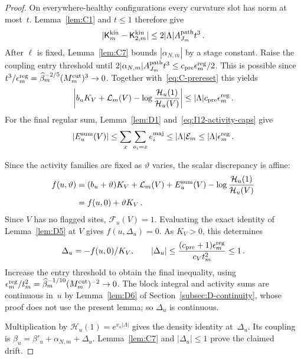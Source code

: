 \begin{proof}
On everywhere-healthy configurations every curvature slot has norm at most~$t$. Lemma~\ref{lem:C1} and $t\le1$ therefore give
\begin{equation*}
|\mathsf K^{\rm kin}_m-\mathsf K^{\rm kin}_{2,m}|\le2|\Lambda|A_{J_m}^{\rm path}t^3\,.
\end{equation*}
After $\ell$ is fixed, Lemma~\ref{lem:C7} bounds $|\alpha_{N,m}|$ by a stage constant. Raise the coupling entry threshold until $2|\alpha_{N,m}|A_{J_m}^{\rm path}t^3\le c_{\rm pre}\epsilon_m^{\rm reg}/2$. This is possible since $t^3/\epsilon_m^{\rm reg}=\widehat{\beta}_m^{-2/5}(M^{\mathrm{cut}}_m)^3\to0$. Together with~\eqref{eq:C-prereset} this yields
\begin{equation*}
\left|b_uK_V+\mathcal L_m(V)-\log\frac{\mathcal H_u(1)}{\mathcal H_u(V)}\right|
\le|\Lambda|c_{\rm pre}\epsilon_m^{\rm reg}\,.
\end{equation*}
For the final regular sum, Lemma~\ref{lem:D1} and~\eqref{eq:I12-activity-caps} give
\begin{equation*}
|E_u^{\rm sum}(V)|\le\sum_x\sum_{o_i=x}e_i^{\rm maj}
\le|\Lambda|\mathcal E_m\le|\Lambda|\epsilon_m^{\rm reg}\,.
\end{equation*}

Since the activity families are fixed as $\vartheta$ varies, the scalar discrepancy is affine:
\begin{align*}
f(u,\vartheta)&=(b_u+\vartheta)K_V+\mathcal L_m(V)+E_u^{\rm sum}(V)
-\log\frac{\mathcal H_u(1)}{\mathcal H_u(V)}\\
&=f(u,0)+\vartheta K_V\,.
\end{align*}
Since $V$ has no flagged sites, $\mathcal F_u(V)=1$. Evaluating the exact identity of Lemma~\ref{lem:D5} at $V$ gives $f(u,\Delta_u)=0$. As $K_V>0$, this determines
\begin{equation*}
\Delta_u=-f(u,0)/K_V,\qquad
|\Delta_u|\le\frac{(c_{\rm pre}+1)\epsilon_m^{\rm reg}}{c_Vt_m^2}\le1\,.
\end{equation*}
Increase the entry threshold to obtain the final inequality, using $\epsilon_m^{\rm reg}/t_m^2=\widehat{\beta}_m^{-1/10}(M^{\mathrm{cut}}_m)^{-2}\to0$. The block integral and activity sums are continuous in~$u$ by Lemma~\ref{lem:D6} of Section~\ref{subsec:D-continuity}, whose proof does not use the present lemma; so $\Delta_u$ is continuous.

Multiplication by $\mathcal H_u(1)=e^{v_u|\Lambda|}$ gives the density identity at~$\Delta_u$. Its coupling is $\beta_u=\beta'_u+\alpha_{N,m}+\Delta_u$. Lemma~\ref{lem:C7} and $|\Delta_u|\le1$ prove the claimed drift.
\end{proof}

